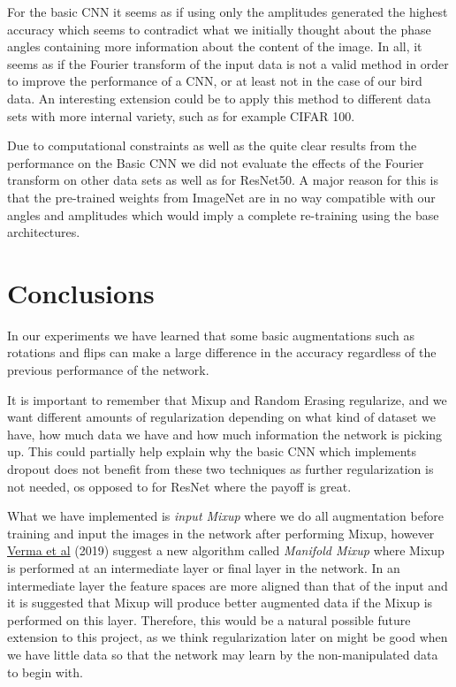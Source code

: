 \documentclass{article}
\begin{document}
For the basic CNN it seems as if using only the amplitudes generated the highest accuracy which seems to contradict what we initially thought about the phase angles containing more information about the content of the image. In all, it seems as if the Fourier transform of the input data is not a valid method in order to improve the performance of a CNN, or at least not in the case of our bird data. An interesting extension could be to apply this method to different data sets with more internal variety, such as for example CIFAR 100.

\medskip

Due to computational constraints as well as the quite clear results from the performance on the Basic CNN we 
did not evaluate the effects of the Fourier transform on other data sets as well as for ResNet50. 
A major reason for this is that the pre-trained weights from ImageNet are in no way 
compatible with our angles and amplitudes which would imply a complete re-training using the base architectures.

\section{Conclusions}

In our experiments we have learned that some basic augmentations such as rotations and flips can make a large difference in the accuracy regardless of the previous performance of the network.

It is important to remember that Mixup and Random Erasing regularize, and we want different amounts of regularization depending on what kind of dataset we have, how much data we have and how much information the network is picking up. This could partially help explain why the basic CNN which implements dropout does not benefit from these two techniques as further regularization is not needed, os opposed to for ResNet where the payoff is great.

What we have implemented is \textit{input Mixup} where we do all augmentation before training and input the images in the network after performing Mixup, however \href{https://arxiv.org/pdf/1806.05236.pdf}{Verma et al} (2019) 
suggest a new algorithm called \textit{Manifold Mixup} where Mixup is performed at an intermediate layer or final layer in the network. In an intermediate layer 
the feature spaces are more aligned than that of the input and it is suggested that Mixup will produce better augmented data if the Mixup is performed on this layer. Therefore, this would be 
a natural possible future extension to this project, as we think regularization later on might be good when we have little data so that the network may learn by the non-manipulated data to begin with. 
\end{document}
